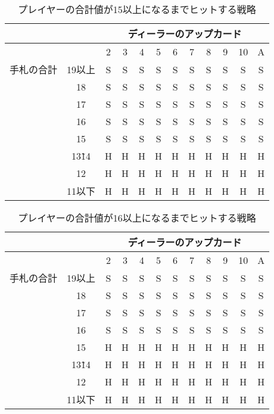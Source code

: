 \begin{table}[htbp]
  \centering
  \caption{プレイヤーの合計値が15以上になるまでヒットする戦略\label{hitleq15}}
  \begin{tabular}{|c|c|c|c|c|c|c|c|c|c|c|c|}
    \hline
    \multicolumn{2}{|c|}{} & \multicolumn{10}{|c|}{ディーラーのアップカード} \\ \hline
    \multicolumn{2}{|c|}{} & 2 & 3 & 4 & 5 & 6 & 7 & 8 & 9 & 10 & A \\ \hline
    手札の合計 & 19以上 & S & S & S & S & S & S & S & S & S & S \\ \cline{3-12}
              & 18 & S & S & S & S & S & S & S & S & S & S \\ \cline{3-12}
              & 17 & S & S & S & S & S & S & S & S & S & S \\ \cline{3-12}
              & 16 & S & S & S & S & S & S & S & S & S & S \\ \cline{3-12}
              & 15 & S & S & S & S & S & S & S & S & S & S \\ \cline{3-12}
              & 13\~ 14 & H & H & H & H & H & H & H & H & H & H \\ \cline{3-12}
              & 12 & H & H & H & H & H & H & H & H & H & H \\ \cline{3-12}
              & 11以下 & H & H & H & H & H & H & H & H & H & H \\ \hline
  \end{tabular}
\end{table}

\begin{table}[htbp]
  \centering
  \caption{プレイヤーの合計値が16以上になるまでヒットする戦略\label{hitleq16}}
  \begin{tabular}{|c|c|c|c|c|c|c|c|c|c|c|c|}
    \hline
    \multicolumn{2}{|c|}{} & \multicolumn{10}{|c|}{ディーラーのアップカード} \\ \hline
    \multicolumn{2}{|c|}{} & 2 & 3 & 4 & 5 & 6 & 7 & 8 & 9 & 10 & A \\ \hline
    手札の合計 & 19以上 & S & S & S & S & S & S & S & S & S & S \\ \cline{3-12}
              & 18 & S & S & S & S & S & S & S & S & S & S \\ \cline{3-12}
              & 17 & S & S & S & S & S & S & S & S & S & S \\ \cline{3-12}
              & 16 & S & S & S & S & S & S & S & S & S & S \\ \cline{3-12}
              & 15 & H & H & H & H & H & H & H & H & H & H \\ \cline{3-12}
              & 13\~ 14 & H & H & H & H & H & H & H & H & H & H \\ \cline{3-12}
              & 12 & H & H & H & H & H & H & H & H & H & H \\ \cline{3-12}
              & 11以下 & H & H & H & H & H & H & H & H & H & H \\ \hline
  \end{tabular}
\end{table}

